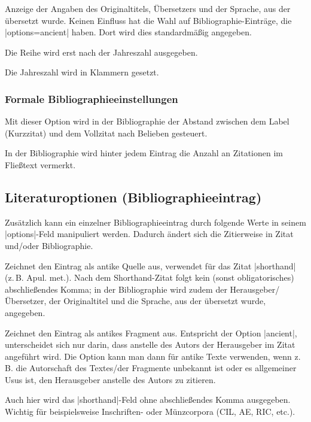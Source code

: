 \documentclass[a4paper,10pt,ngerman]{ltxdoc}
\begin{document}
  Anzeige der Angaben des Originaltitels, Übersetzers und der Sprache, aus der übersetzt wurde. 
Keinen Einfluss hat die Wahl auf Bibliographie-Einträge, die |options=ancient| haben. 
Dort wird dies standardmäßig angegeben.

  Die Reihe wird erst nach der Jahreszahl ausgegeben.
 
  Die Jahreszahl wird in Klammern gesetzt.

\subsubsection{Formale Bibliographieeinstellungen}

  Mit dieser Option wird in der Bibliographie der Abstand zwischen dem Label (Kurzzitat) und dem Vollzitat nach Belieben gesteuert.
 
  In der Bibliographie wird hinter jedem Eintrag die Anzahl an Zitationen im Fließtext vermerkt. 

\subsection{Literaturoptionen (Bibliographieeintrag)}\label{bib_options}
Zusätzlich kann ein einzelner Bibliographieeintrag durch folgende Werte in seinem |options|-Feld manipuliert werden. Dadurch ändert sich die Zitierweise in Zitat und/oder Bibliographie.

  Zeichnet den Eintrag als antike Quelle aus, verwendet für das Zitat |shorthand| (z.\,B. Apul. met.). Nach dem Shorthand-Zitat folgt kein (sonst obligatorisches) abschließendes Komma; in der Bibliographie wird zudem der Herausgeber/Übersetzer, der Originaltitel und die Sprache, aus der übersetzt wurde, angegeben.

  Zeichnet den Eintrag als antikes Fragment aus. Entspricht der Option |ancient|, unterscheidet sich nur darin, dass anstelle des Autors der Herausgeber im Zitat angeführt wird. Die Option kann man dann für antike Texte verwenden, wenn z.\,B. die Autorschaft des Textes/der Fragmente unbekannt ist oder es allgemeiner Usus ist, den Herausgeber anstelle des Autors zu zitieren.

  Auch hier wird das |shorthand|-Feld ohne abschließendes Komma ausgegeben. 
Wichtig für beispielsweise Inschriften- oder Münzcorpora (CIL, AE, RIC, etc.). 
\end{document}
